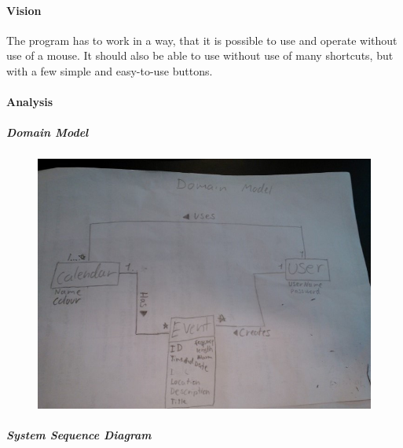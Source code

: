 \documentclass{article}
\begin{document}
  \paragraph{Vision} \mbox{} 
  
  The program has to work in a way, that it is possible to use and operate without use of a mouse. It should also be able to use without use of many shortcuts, but with a few simple and easy-to-use buttons. 
  
  	\paragraph{Analysis} \mbox{}
  	
	
	\newpage
	\subparagraph{Domain Model} \mbox{}
	
	\begin{figure}[h]
	\caption{}
	\hspace{-50pt}   
   	\includegraphics[scale=.65]{LatexFiles/Analyze/DomainModel/DomainModel}
   	\end{figure}
	
\newpage
	\subparagraph{System Sequence Diagram} \mbox{}
\end{document}

